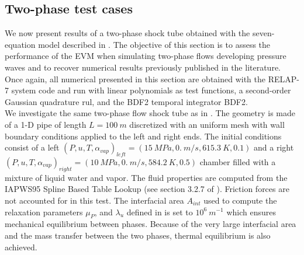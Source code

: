 \documentclass{inputs/mc2015}
\begin{document}
\subsection{Two-phase test cases} \label{sec:2-phase-problems}
%
We now present results of a two-phase shock tube obtained with the seven-equation model described in . %
The objective of this section is to assess the performance of the EVM when simulating two-phase flows developing pressure waves and to recover numerical results previously published in the literature. Once again, all numerical presented in this section are obtained with the RELAP-7 system code and run with linear polynomials as test functions, a second-order Gaussian quadrature rul, and the BDF2 temporal integrator BDF2. \\
We investigate the same two-phase flow shock tube as in \cite{Sokolowski-Koszela, waha-manual}. The geometry is made of a 1-D pipe of length $L = 100\ m$ discretized with an uniform mesh with wall boundary conditions applied to the left and right ends. The initial conditions consist of a left $(P, u, T, \alpha_{vap})_{left} = (15 \ MPa, 0. \ m/s, 615.3 \ K, 0.1)$ and a right $(P, u, T, \alpha_{vap})_{right} = (10 \ MPa, 0. \ m/s, 584.2 \ K, 0.5)$ chamber filled with a mixture of liquid water and vapor. The fluid properties are computed from the IAPWS95 Spline Based Table Lookup (see section 3.2.7 of \cite{Berry_Peterson_2014}). Friction forces are not accounted for in this test. The interfacial area $A_{int}$ used to compute the relaxation parameters $\mu_P$, and $\lambda_u$ defined in  is set to $10^6 \ m^{-1}$ which ensures mechanical equilibrium between phases. Because of the very large interfacial area and the mass transfer between the two phases, thermal equilibrium is also achieved.
\end{document}
